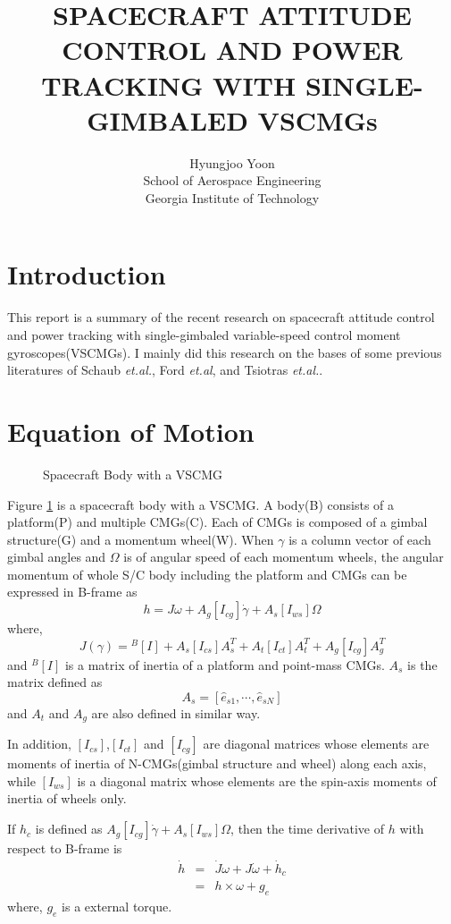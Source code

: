 \documentclass[12pt]{article}
\title{SPACECRAFT ATTITUDE CONTROL AND POWER TRACKING WITH SINGLE-GIMBALED
VSCMGs}
\author{ Hyungjoo Yoon \\ School of Aerospace Engineering\\ Georgia Institute of
Technology}
\newcommand{\beq}{\begin{equation}}
\newcommand{\eeq}{\end{equation}}
\newcommand{\beqa}{\begin{eqnarray}}
\newcommand{\eeqa}{\end{eqnarray}}
\begin{document}
\maketitle

\section{Introduction}
This report is a summary of the recent research on
spacecraft attitude control and power tracking with
single-gimbaled variable-speed control moment gyroscopes(VSCMGs).
I mainly did this research on the bases of some previous
literatures of Schaub {\it et.al.}\cite{schaub1}\cite{schaub2}, Ford {\it et.al}\cite{ford1}\cite{ford2}, and Tsiotras {\it et.al.}\cite{tsiotras1}.

\section{Equation of Motion}

\begin{figure}[h]
\centering
{}
\caption{Spacecraft Body with a VSCMG}
\label{fig01}
\end{figure}

Figure \ref{fig01} is a spacecraft body with a VSCMG. A body(B)
consists of a platform(P) and multiple CMGs(C). Each of CMGs is
composed of a gimbal structure(G) and a momentum wheel(W).
When $\gamma$ is a column vector of each gimbal angles and $\Omega$ is
of angular speed of each momentum wheels, the angular momentum of whole S/C body including the platform and CMGs
can be expressed in B-frame as
\beq
h = J \omega + A_g [I_{cg}]\dot{\gamma} +
A_s [I_{ws}]\Omega
\eeq
where,
\beq
J(\gamma) = {}^B [I] + A_s [I_{cs}]A_s^T + A_t [I_{ct}]A_t^T + A_g [I_{cg}]A_g^T
\eeq
and
${}^B[I]$ is a matrix of inertia of a platform and point-mass
CMGs. $A_s$ is the matrix defined as
\beq
A_s = \left[ \hat{e}_{s1},\cdots ,\hat{e}_{sN} \right]
\eeq
and $A_t$ and $A_g$ are also defined in similar way.

In addition, $[I_{cs}]$,$[I_{ct}]$ and $[I_{cg}]$ are diagonal
matrices whose elements are moments of inertia of N-CMGs(gimbal structure and wheel) along
each axis, while $[I_{ws}]$ is a diagonal matrix whose elements
are the spin-axis moments of inertia of wheels only.

If $h_c$ is defined as $A_g [I_{cg}]\dot{\gamma} +
A_s [I_{ws}]\Omega$, then the time derivative of $h$ with respect to
B-frame is
\beqa
\dot{h} &=& \dot{J}\omega + J \dot{\omega} + \dot{h}_c \label{eq01} \\
&=& h \times \omega + g_e \label{eq02}
\eeqa
where, $g_e$ is a external torque.
\end{document}

